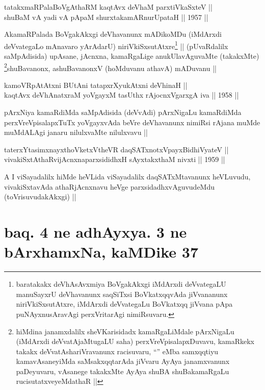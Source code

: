 \begin{shl}
tatakxmaRPalaBoVgAthaRM kaqtAvx deVhaM parxtiVkaSxteV ||  \\
shuBaM vA yadi vA pApaM shurxtakamARnurUpataH ||  1957 ||  
\end{shl}

\begin{artha}
AkamaRPalada BoVgakAkxgi deVhavanunx mADikoMDu (iMdArxdi deVvategaLo
mAnavaro yArAdarU) niriVkiSxsutAtxre\footnote[1]{baratakakx
deVhAsAvxmiya BoVgakAkxgi iMdArxdi deVvategaLU manuSayxrU
deVhavanunx saqSiTxsi BoVkatxqqvAda jiVvananunx niriVkiSxsutAtxre,
iMdArxdi deVvategaLu BoVkatxqq jiVvana pApa puNAyxnusAravAgi
perxVritarAgi nimiRsuvaru.} || (pUvaRdalilx
saMpAdisida) upAsane, jAcnxna, kamaRgaLige anukUlavAguvaMte
(takakxMte) \footnote[2]{hiMdina janamxdalilx sheVKarisidadx
kamaRgaLiMdale pArxNigaLu (iMdArxdi deVvatAjaMtugaLU saha)
perxVreVpisalapxDuvavu, kamaRkekx takakx deVvatAshariVravanunx
racisuvaru, ``\stext'' eMba samxqqtiyu kamavAsaneyiMda
saMsakxqqtarAda jiVvaru AyAya janamxvanunx paDeyuvaru, vAsanege
takakxMte AyAya shuBA shuBakamaRgaLu rucisutatxveyeMdathaR ||}shuBavanonx, ashuBavanonxV (hoMduvanu
athavA) mADuvanu ||
\end{artha}

\begin{shl}
kamoVRpAtAtxni BUtAni tatapxrXyukAtxni deVhinaH || \\
kaqtAvx deVhAnatxraM yoVgayxM tasUthx rAjocnxV\s garxgA iva ||  1958 ||  
\end{shl}

\begin{artha}
pArxNiya kamaRdiMda saMpAdisida (deVvAdi) pArxNigaLu kamaRdiMda
perxVreVpisalapxTuTx yoVgayxvAda beVre deVhavanunx nimiRsi rAjana
muMde muMdALAgi janaru nilulxvaMte nilulxvavu ||
\end{artha}

\begin{shl}
taterxYtasimxnayxthoVketxV\s theVR daqSATxnotxV\s payxBidhiVyateV ||  \\
vivakiSxtAthaRvijAcnxnaparxsididhxH sAyxtakxthaM nivxti ||  1959 ||  
\end{shl}

\begin{artha}
A I viSayadalilx hiMde heVLida viSayadalilx daqSATxMtavanunx
heVLuvudu, vivakiSxtavAda athaRjAcnxnavu heVge parxsidadhxvAguvudeMdu
(toVrisuvudakAkxgi) ||
\end{artha}

\section*{baq. 4 ne adhAyxya. 3 ne bArxhamxNa, kaMDike 37}

